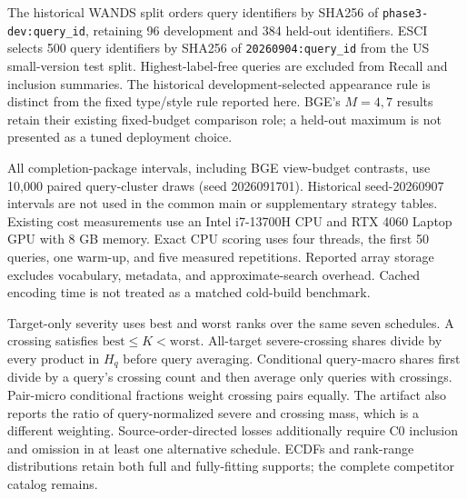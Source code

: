 


The historical WANDS split orders query identifiers by SHA256 of
\texttt{phase3-dev:query\_id}, retaining 96 development and 384 held-out identifiers.
ESCI selects 500 query identifiers by SHA256 of \texttt{20260904:query\_id} from
the US small-version test split. Highest-label-free queries are excluded from
Recall and inclusion summaries. The historical development-selected appearance
rule is distinct from the fixed type/style rule reported here. BGE's $M=4,7$
results retain their existing fixed-budget comparison role; a held-out maximum
is not presented as a tuned deployment choice.

All completion-package intervals, including BGE view-budget contrasts, use
10,000 paired query-cluster draws (seed 2026091701). Historical seed-20260907
intervals are not used in the common main or supplementary strategy tables. Existing cost measurements use an Intel i7-13700H CPU
and RTX 4060 Laptop GPU with 8 GB memory. Exact CPU scoring uses four threads,
the first 50 queries, one warm-up, and five measured repetitions. Reported array
storage excludes vocabulary, metadata, and approximate-search overhead.
Cached encoding time is not treated as a matched cold-build benchmark.

Target-only severity uses best and worst ranks over the same seven schedules.
A crossing satisfies $\mathrm{best}\leq K<\mathrm{worst}$.
All-target severe-crossing shares divide by every product in $H_q$ before query
averaging. Conditional query-macro shares first divide by a query's crossing
count and then average only queries with crossings. Pair-micro conditional
fractions weight crossing pairs equally. The artifact also reports the ratio
of query-normalized severe and crossing mass, which is a different weighting.
Source-order-directed losses additionally require C0 inclusion and omission in
at least one alternative schedule. ECDFs and rank-range distributions retain
both full and fully-fitting supports; the complete competitor catalog remains.
